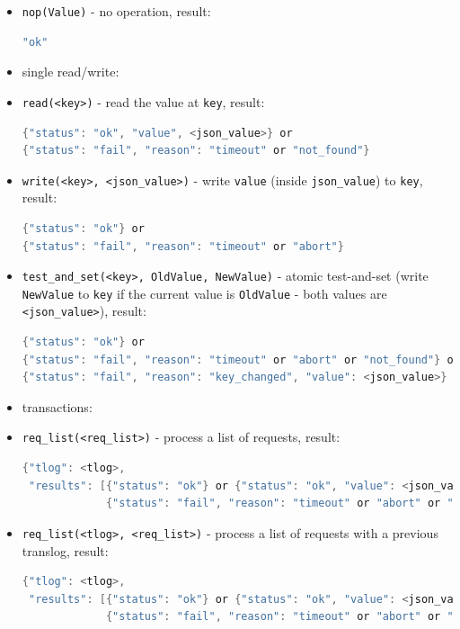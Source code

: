 \documentclass[a4paper]{scrreprt}
\newcommand{\code}[1]{\lstinline[basicstyle=\ttfamily]!#1!}
\begin{document}
\begin{itemize}
  \item \code{nop(Value)} - no operation, result:
\begin{lstlisting}[language=java]
"ok"
\end{lstlisting}
  \item[] \hspace{-1.7em}single read/write:
  \item \code{read(<key>)} - read the value at \code{key}, result:
\begin{lstlisting}[language=java]
{"status": "ok", "value", <json_value>} or
{"status": "fail", "reason": "timeout" or "not_found"}
\end{lstlisting}
  \item \code{write(<key>, <json_value>)} - write \code{value} (inside \code{json_value}) to \code{key}, result:
\begin{lstlisting}[language=java]
{"status": "ok"} or
{"status": "fail", "reason": "timeout" or "abort"}
\end{lstlisting}
  \item \code{test_and_set(<key>, OldValue, NewValue)} - atomic test-and-set
  (write \code{NewValue} to \code{key} if the current value is \code{OldValue}
   - both values are \code{<json_value>}), result:
\begin{lstlisting}[language=java]
{"status": "ok"} or
{"status": "fail", "reason": "timeout" or "abort" or "not_found"} or
{"status": "fail", "reason": "key_changed", "value": <json_value>}
\end{lstlisting}
  \item[] \hspace{-1.7em}transactions:
  \item \code{req_list(<req_list>)} - process a list of requests, result:
\begin{lstlisting}[language=java]
{"tlog": <tlog>,
 "results": [{"status": "ok"} or {"status": "ok", "value": <json_value>} or
             {"status": "fail", "reason": "timeout" or "abort" or "not_found"}]}
\end{lstlisting}
  \item \code{req_list(<tlog>, <req_list>)} - process a list of requests with a previous translog, result:
\begin{lstlisting}[language=java]
{"tlog": <tlog>,
 "results": [{"status": "ok"} or {"status": "ok", "value": <json_value>} or
             {"status": "fail", "reason": "timeout" or "abort" or "not_found"}]}
\end{lstlisting}

\end{itemize}
\end{document}
